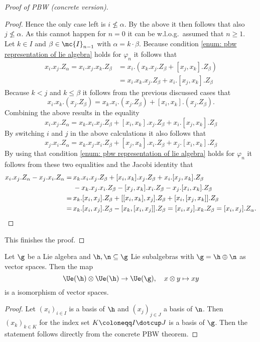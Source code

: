 \begin{proof}[Proof of PBW (concrete version)]
\begin{proof}
  Hence the only case left is $i \nleq \alpha$. By the above it then follows that also $j \nleq \alpha$. As this cannot happen for $n = 0$ it can be w.l.o.g.\ assumed that $n \geq 1$. Let $k \in I$ and $\beta \in \mc{I}_{n-1}$ with $\alpha = k \cdot \beta$. Because condition \ref{enum: pbw representation of lie algebra} holds for $\varphi_n$ it follows that
  \begin{align*}
   x_i.x_j.Z_\alpha
   = x_i.x_j.x_k.Z_\beta
   &= x_i.(x_k.x_j.Z_\beta + [x_j, x_k].Z_\beta) \\
   &= x_i.x_k.x_j.Z_\beta + x_i.[x_j, x_k].Z_\beta
  \end{align*}
  Because $k < j$ and $k \leq \beta$ it follows from the previous discussed cases that
  \[
   x_i.x_k.(x_j.Z_\beta)
   = x_k.x_i.(x_j.Z_\beta) + [x_i, x_k].(x_j.Z_\beta).
  \]
  Combining the above results in the equality
  \[
   x_i.x_j.Z_\alpha
   = x_k.x_i.x_j.Z_\beta + [x_i, x_k].x_j.Z_\beta + x_i.[x_j, x_k].Z_\beta
  \]
  By switching $i$ and $j$ in the above calculations it also follows that 
  \[
   x_j.x_i.Z_\alpha
   = x_k.x_j.x_i.Z_\beta + [x_j, x_k].x_i.Z_\beta + x_j.[x_i, x_k].Z_\beta
  \]
  By using that condition \ref{enum: pbw representation of lie algebra} holds for $\varphi_n$ it follows from these two equalities and the Jacobi identity that
  \begin{align*}
        x_i.x_j.Z_\alpha - x_j.x_i.Z_\alpha 
   =&\, x_k.x_i.x_j.Z_\beta + [x_i, x_k].x_j.Z_\beta + x_i.[x_j, x_k].Z_\beta \\
    &\, - x_k.x_j.x_i.Z_\beta - [x_j, x_k].x_i.Z_\beta - x_j.[x_i, x_k].Z_\beta \\
   =&\, x_k.[x_i, x_j].Z_\beta + [[x_i, x_k], x_j].Z_\beta +  [x_i,[x_j,x_k]].Z_\beta \\
   =&\, x_k.[x_i, x_j].Z_\beta - [x_k, [x_i, x_j]].Z_\beta
   =    [x_i, x_j].x_k.Z_\beta
   =    [x_i, x_j].Z_\alpha.
  \qedhere
  \end{align*}
 \end{proof}
 This finishes the proof. 
\end{proof}


\begin{corollary}
 Let $\g$ be a Lie algebra and $\h, \n \subseteq \g$ Lie subalgebras with $\g = \h \oplus \n$ as vector spaces. Then the map
 \[
  \Ue(\h) \otimes \Ue(\h) \to \Ue(\g), \quad x \otimes y \mapsto xy
 \]
 is a isomorphism of vector spaces.
\end{corollary}
\begin{proof}
 Let $(x_i)_{i \in I}$ is a basis of $\h$ and $(x_j)_{j \in J}$ a basis of $\n$. Then $(x_k)_{k \in K}$ for the index set $K \coloneqq I \dotcup J$ is a basis of $\g$. Then the statement follows directly from the concrete PBW theorem.
\end{proof}



